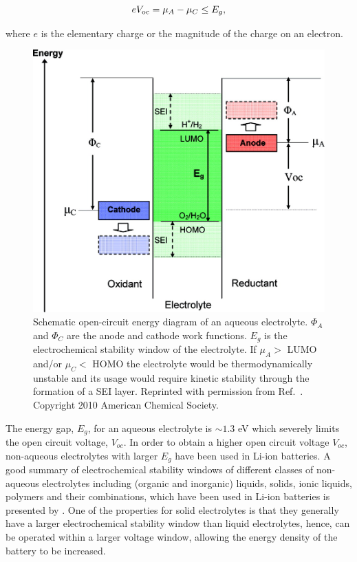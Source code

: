 \documentclass[../main.tex]{subfiles}
\begin{document}
\begin{equation}
    eV_{\rm oc}=\mu_{A}-\mu_{C}\leq E_{g},
\end{equation}

where $e$ is the elementary charge or the magnitude of the charge on an electron. 

\begin{figure}
    \centering
    \includegraphics{figures/electrolyte.jpeg}
    \caption{Schematic open-circuit energy diagram of an aqueous electrolyte. $\Phi_{A}$ and $\Phi_{C}$ are the anode and cathode work functions. $E_{g}$ is the electrochemical stability window of the electrolyte. If $\mu_{A}>$ LUMO and/or $\mu_{C}<$ HOMO the electrolyte would be thermodynamically unstable and its usage would require kinetic stability through the formation of a SEI layer. Reprinted with permission from Ref.~. Copyright 2010 American Chemical Society.}
    \label{fig:electrolyte}
\end{figure}

The energy gap, $E_g$, for an aqueous electrolyte is $\sim 1.3$ eV which severely limits the open circuit voltage, $V_{oc}$. In order to obtain a higher open circuit voltage $V_{oc}$, non-aqueous electrolytes with larger $E_g$ have been used in Li-ion batteries.\cite{Xu2004, Goodenough2010} A good summary of electrochemical stability windows of different classes of non-aqueous electrolytes including (organic and inorganic) liquids, solids, ionic liquids, polymers and their combinations, which have been used in Li-ion batteries is presented by \citeauthor{Goodenough2010}.\cite{Goodenough2010} One of the properties for solid electrolytes is that they generally have a larger electrochemical stability window than liquid electrolytes,\cite{Goodenough2010} hence, can be operated within a larger voltage window, allowing the energy density of the battery to be increased.
\end{document}
